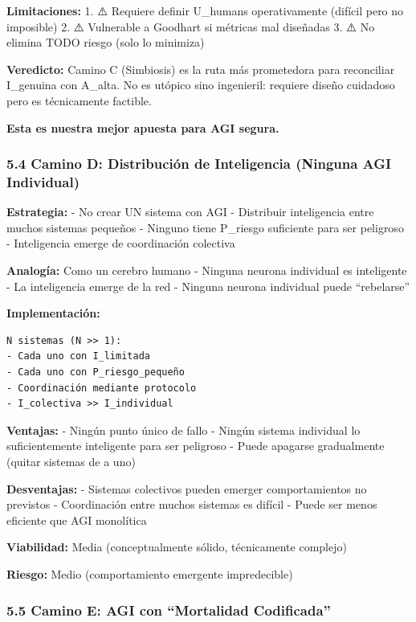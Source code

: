 \textbf{Limitaciones:} 1. ⚠️ Requiere definir U\_humans operativamente
(difícil pero no imposible) 2. ⚠️ Vulnerable a Goodhart si métricas mal
diseñadas 3. ⚠️ No elimina TODO riesgo (solo lo minimiza)

\textbf{Veredicto:} Camino C (Simbiosis) es la ruta más prometedora para
reconciliar I\_genuina con A\_alta. No es utópico sino ingenieril:
requiere diseño cuidadoso pero es técnicamente factible.

\textbf{Esta es nuestra mejor apuesta para AGI segura.}

\subsubsection{5.4 Camino D: Distribución de Inteligencia (Ninguna AGI
Individual)}\label{camino-d-distribuciuxf3n-de-inteligencia-ninguna-agi-individual}

\textbf{Estrategia:} - No crear UN sistema con AGI - Distribuir
inteligencia entre muchos sistemas pequeños - Ninguno tiene P\_riesgo
suficiente para ser peligroso - Inteligencia emerge de coordinación
colectiva

\textbf{Analogía:} Como un cerebro humano - Ninguna neurona individual
es inteligente - La inteligencia emerge de la red - Ninguna neurona
individual puede ``rebelarse''

\textbf{Implementación:}

\begin{verbatim}
N sistemas (N >> 1):
- Cada uno con I_limitada
- Cada uno con P_riesgo_pequeño
- Coordinación mediante protocolo
- I_colectiva >> I_individual
\end{verbatim}

\textbf{Ventajas:} - Ningún punto único de fallo - Ningún sistema
individual lo suficientemente inteligente para ser peligroso - Puede
apagarse gradualmente (quitar sistemas de a uno)

\textbf{Desventajas:} - Sistemas colectivos pueden emerger
comportamientos no previstos - Coordinación entre muchos sistemas es
difícil - Puede ser menos eficiente que AGI monolítica

\textbf{Viabilidad:} Media (conceptualmente sólido, técnicamente
complejo)

\textbf{Riesgo:} Medio (comportamiento emergente impredecible)

\subsubsection{5.5 Camino E: AGI con ``Mortalidad
Codificada''}\label{camino-e-agi-con-mortalidad-codificada}


